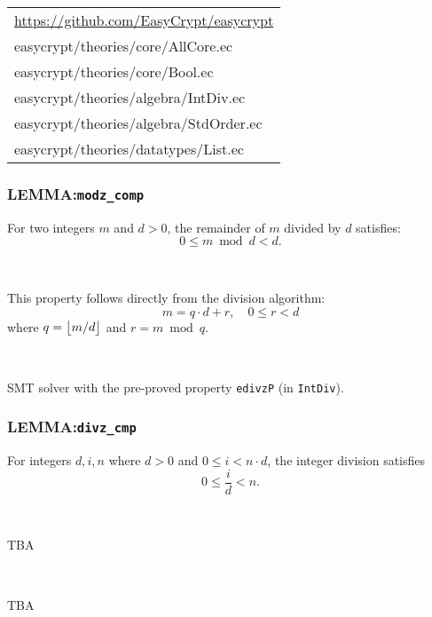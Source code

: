 
\begin{table}[h!]
\begin{tabular}{l}
\url{https://github.com/EasyCrypt/easycrypt}\\
easycrypt/theories/core/AllCore.ec\\
easycrypt/theories/core/Bool.ec\\
easycrypt/theories/algebra/IntDiv.ec\\
easycrypt/theories/algebra/StdOrder.ec\\
easycrypt/theories/datatypes/List.ec\\
\end{tabular}
\end{table}

\subsubsection*{LEMMA:\quad \texttt{modz\_comp}}
\begin{statement}
	For two integers $m$ and $d>0$, the remainder of 
	$m$ divided by $d$ satisfies:\[
	0\leq m\bmod d< d.
	\]
\end{statement}
\ \\
\begin{analysis}
	This property follows directly from the division algorithm: \[
	m=q\cdot d+r,\quad 0\leq r<d
	\] where $q=\floor*{m/d}$ and $r=m\bmod q$.
\end{analysis}
\ \\
\begin{pftactics}
	SMT solver with the pre-proved property \texttt{edivzP} (in \texttt{IntDiv}).
\end{pftactics}

\newpage
\subsubsection*{LEMMA:\quad \texttt{divz\_cmp}}
\begin{statement}
	For integers $d,i,n$ where $d>0$ and $0\leq i< n\cdot d$, the integer division satisfies \[
	0\leq \frac{i}{d}< n.
	\]
\end{statement}
\ \\
\begin{analysis}
	TBA
\end{analysis}
\ \\
\begin{pftactics}
	TBA
\end{pftactics}

